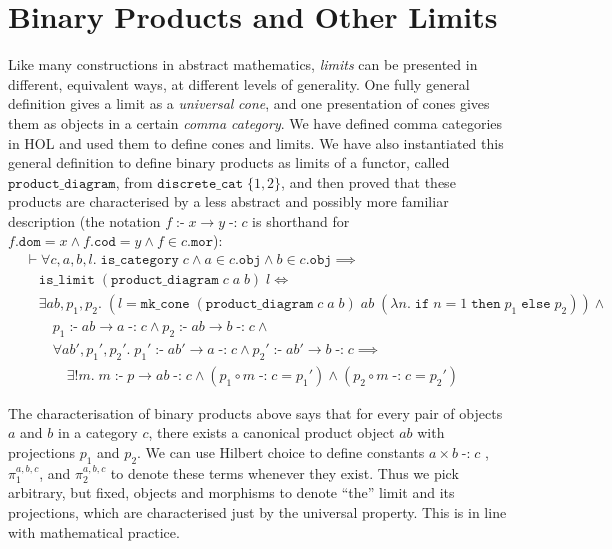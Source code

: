 \documentclass[twoside,titlepage,11pt]{article}
\begin{document}
\section{Binary Products and Other Limits}%
\label{limits}
Like many constructions in abstract mathematics, \emph{limits} can be presented in different, equivalent ways, at different levels of generality.
One fully general definition gives a limit as a \emph{universal} \emph{cone}, and one presentation of cones gives them as objects in a certain \emph{comma category}.
We have defined comma categories in HOL and used them to define cones and limits.
We have also instantiated this general definition to define binary products as limits of a functor, called $\mathtt{product\_diagram}$, from $\mathtt{discrete\_cat}\;\{1,2\}$, and then proved that these products are characterised by a less abstract and possibly more familiar description (the notation $f\operatorname{\mathtt{:-}}x\to y\operatorname{\mathtt{-:}}c$ is shorthand for $f.\mathtt{dom}=x\land f.\mathtt{cod}=y\land f\in c.\mathtt{mor}$):
\begin{align*}
&\vdash\forall{c,a,b,l}.\;\mathtt{is\_category}\;c\land a\in c.\mathtt{obj}\land b \in c.\mathtt{obj}\implies\\
&\quad\mathtt{is\_limit}\;(\mathtt{product\_diagram}\;c\;a\;b)\;l\iff\\
&\quad\exists{ab,p_1,p_2}.\;(l = \mathtt{mk\_cone}\;(\mathtt{product\_diagram}\;c\;a\;b)\;ab\;(\lambda{n}.\; \mathtt{if}\;n = 1\;\mathtt{then}\;p_1\;\mathtt{else}\;p_2))\land{}\\
&\quad\quad p_1\operatorname{\mathtt{:-}}ab \to a\operatorname{\mathtt{-:}}c\land p_2\operatorname{\mathtt{:-}}ab \to b\operatorname{\mathtt{-:}}c\land{}\\
&\quad\quad\forall{ab',p_1',p_2'}.\;
p_1'\operatorname{\mathtt{:-}} ab' \to a \operatorname{\mathtt{-:}}c\land
p_2'\operatorname{\mathtt{:-}} ab' \to b \operatorname{\mathtt{-:}}c\implies\\
&\quad\quad\quad\exists!{m}.\;
m\operatorname{\mathtt{:-}}p\to ab\operatorname{\mathtt{-:}}c\land(p_1\circ m\operatorname{\mathtt{-:}}c = p_1')\land(p_2\circ m\operatorname{\mathtt{-:}}c = p_2')
\end{align*}

The characterisation of binary products above says that for every pair of objects $a$ and $b$ in a category $c$, there exists a canonical product object $ab$ with projections $p_1$ and $p_2$.
We can use Hilbert choice to define constants $a\times b\operatorname{\mathtt{-:}}c$ , $\pi_1^{a,b,c}$, and $\pi_2^{a,b,c}$ to denote these terms whenever they exist.
Thus we pick arbitrary, but fixed, objects and morphisms to denote ``the'' limit and its projections, which are characterised just by the universal property.
This is in line with mathematical practice.
\end{document}
